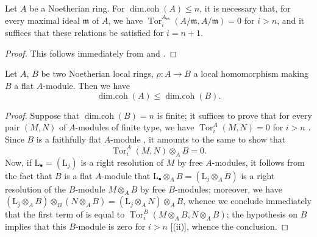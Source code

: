 \begin{corollary}[17.2.12]
\label{0.17.2.12}
Let $A$ be a Noetherian ring.
For $\operatorname{dim.coh}(A)\leq n$, it is necessary that, for every maximal ideal $\mathfrak{m}$ of $A$, we have $\operatorname{Tor}^{A_\mathfrak{m}}_i(A/\mathfrak{m},A/\mathfrak{m})=0$ for $i>n$, and it suffices that these relations be satisfied for $i=n+1$.
\end{corollary}

\begin{proof}
This follows immediately from  and .
\end{proof}

\begin{proposition}[17.2.13]
\label{0.17.2.13}
Let $A$, $B$ be two Noetherian local rings, $\rho:A\to B$ a local homomorphism making $B$ a flat $A$-module.
Then we have
\[
\label{0.17.2.13.1}
  \operatorname{dim.coh}(A)\leq\operatorname{dim.coh}(B).
  \tag{17.2.13.1}
\]
\end{proposition}

\begin{proof}
Suppose that $\operatorname{dim.coh}(B)=n$ is finite;
it suffices to prove that for every pair $(M,N)$ of $A$-modules of finite type, we have $\operatorname{Tor}^A_i(M,N)=0$ for $i>n$ .
Since $B$ is a faithfully flat $A$-module , it amounts to the same  to show that
\[
\label{0.17.2.13.2}
  \operatorname{Tor}^A_i(M,N)\otimes_A B=0.
  \tag{17.2.13.2}
\]
Now, if $\mathrm{L}_\bullet=(\mathrm{L}_j)$ is a right resolution of $M$ by free $A$-modules, it follows from the fact that $B$ is a flat $A$-module that $\mathrm{L}_\bullet\otimes_A B=(\mathrm{L}_j\otimes_A B)$ is a right resolution of the $B$-module $M\otimes_A B$ by free $B$-modules;
moreover, we have $(\mathrm{L}_j\otimes_A B)\otimes_B(N\otimes_A B)=(\mathrm{L}_j\otimes_A N)\otimes_A B$, whence we conclude immediately that the first term of  is equal to $\operatorname{Tor}^B_i(M\otimes_A B,N\otimes_A B)$;
the hypothesis on $B$ implies that this $B$-module is zero for $i>n$ [(ii)], whence the conclusion.
\end{proof}

